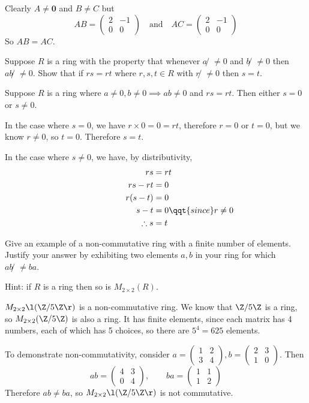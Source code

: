 \documentclass[a4paper]{article}
\begin{document}
Clearly $A \ne \mathbf 0$ and $B \ne C$ but $$AB = \begin{pmatrix}2 & -1\\ 0 & 0\end{pmatrix} \quad \text{and} \quad AC = \begin{pmatrix}2 & -1\\ 0 & 0\end{pmatrix}$$
So $AB = AC$.


\begin{questionbody}
Suppose $R$ is a ring with the property that whenever $a̸ \ne 0$ and $b̸ \ne 0$ then $ab̸ \ne 0$. Show that if $rs = rt$ where $r, s, t \in R$ with $r̸ \ne 0$ then $s = t$.
\end{questionbody}

Suppose $R$ is a ring where $a \ne 0, b \ne 0 \implies ab \ne 0$ and $rs = rt$. Then either $s = 0$ or $s \ne 0$.

In the case where $s = 0$, we have $r \times 0 = 0 = rt$, therefore $r=0$ or $t=0$, but we know $r \ne 0$, so $t = 0$. Therefore $s=t$.

In the case where $s \ne 0$, we have, by distributivity, \begin{align*}
	rs &= rt\\
	\phantom{paddingpaddi} rs - rt &= 0\\
	r (s - t) &= 0\\
	s - t &= 0 \qqt{since } r \ne 0\\
	\therefore s &= t
\end{align*}


\begin{questionbody}
Give an example of a non-commutative ring with a finite number of elements. Justify your answer by exhibiting two elements $a, b$ in your ring for which $ab̸ \ne ba$.

Hint: if $R$ is a ring then so is $M_{2 \times 2}(R)$.
\end{questionbody}

$M_{2 \times 2} \l( \Z / 5\Z \r)$ is a non-commutative ring. We know that $\Z / 5\Z$ is a ring, so $M_{2 \times 2}(\Z / 5 \Z)$ is also a ring. It has finite elements, since each matrix has 4 numbers, each of which has 5 choices, so there are $5^4 = 625$ elements.

To demonstrate non-commutativity, consider $a = \begin{pmatrix}1 & 2\\ 3 & 4\end{pmatrix}, b = \begin{pmatrix}2 & 3\\ 1 & 0\end{pmatrix}$. Then $$ab = \begin{pmatrix}4 & 3\\ 0 & 4\end{pmatrix}, \qquad ba = \begin{pmatrix}1 & 1\\ 1 & 2\end{pmatrix}$$
Therefore $ab \ne ba$, so $M_{2 \times 2} \l( \Z / 5\Z \r)$ is not commutative.
\end{document}
